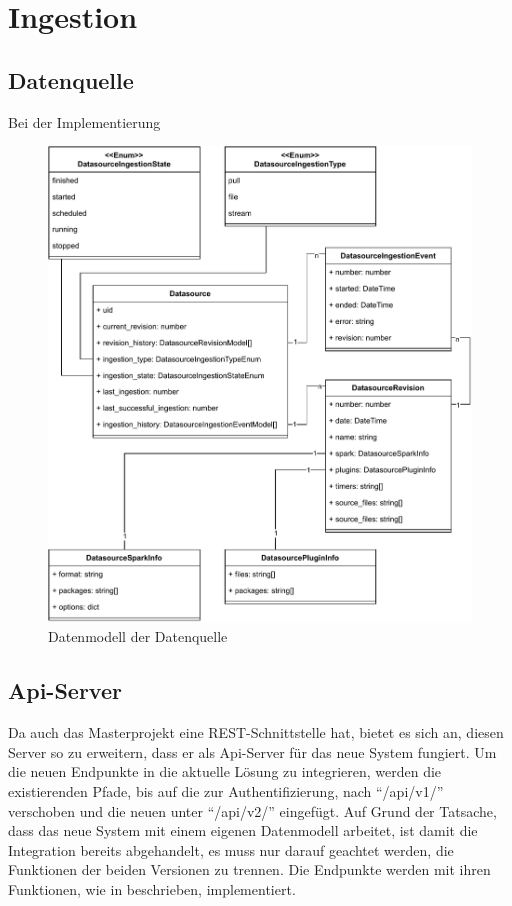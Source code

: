 \section{Ingestion}

\subsection{Datenquelle}

Bei der Implementierung 

\begin{figure}
    \centering
    \includegraphics{Grafiken/ingestion-Datamodel.pdf}
    \caption{Datenmodell der Datenquelle}
    \label{fig:datasource_model}
\end{figure}

\subsection{Api-Server}

Da auch das Masterprojekt eine REST-Schnittstelle hat, bietet es sich an, diesen Server so zu erweitern, dass er als Api-Server für das neue System fungiert.
Um die neuen Endpunkte in die aktuelle Lösung zu integrieren, werden die existierenden Pfade, bis auf die zur Authentifizierung, nach "`/api/v1/"' verschoben und die neuen unter "`/api/v2/"' eingefügt.
Auf Grund der Tatsache, dass das neue System mit einem eigenen Datenmodell arbeitet, ist damit die Integration bereits abgehandelt, es muss nur darauf geachtet werden, die Funktionen der beiden Versionen zu trennen.
Die Endpunkte werden mit ihren Funktionen, wie in  beschrieben, implementiert.

